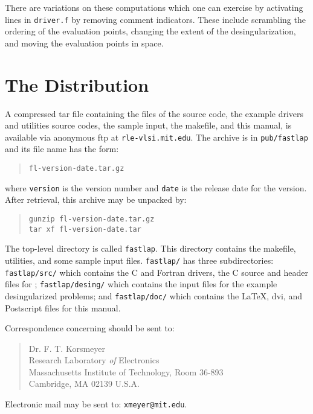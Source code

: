 There are variations on these computations which one can exercise by
activating lines in {\tt driver.f} by removing comment indicators.  
These include scrambling the ordering of the evaluation
points, changing the extent of the desingularization, and moving
the evaluation points in space.  

\newpage
\section{The \fas Distribution}
\label{s:dist}
A compressed tar file containing the files of the \fas source code, the 
example drivers and utilities source codes, the sample input, the makefile, 
and this manual, 
is available via anonymous ftp at {\tt rle-vlsi.mit.edu}.  The archive 
is in {\tt pub/fastlap} and its file name has the form:

\begin{quote}
\begin{verbatim}
fl-version-date.tar.gz
\end{verbatim}
\end{quote}
\noindent
where {\tt version} is the version number and {\tt date} is the release 
date for the version.  After retrieval, this archive may be unpacked by:
\begin{quote}
\begin{verbatim}
gunzip fl-version-date.tar.gz
tar xf fl-version-date.tar
\end{verbatim}
\end{quote}
The top-level directory is called {\tt fastlap}.  This 
directory contains the makefile, utilities, and some  
sample input files.     
{\tt fastlap/}  has three subdirectories:
{\tt fastlap/src/} which contains the C and Fortran drivers, the C source and header 
files for \fas; {\tt fastlap/desing/} which contains the input files for the example
desingularized problems; and {\tt fastlap/doc/} which contains the \LaTeX, dvi, and 
Postscript files for this manual.

Correspondence concerning \fas should be sent to:
\begin{quote}
Dr. F. T. Korsmeyer\\
Research Laboratory {\em of}  Electronics\\ 
Massachusetts Institute of Technology, Room 36-893\\
Cambridge, MA 02139 U.S.A.
\end{quote}

Electronic mail may be sent to: {\tt xmeyer@mit.edu}. 

